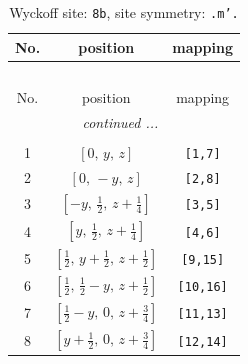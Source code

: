 \documentclass[fleqn,8pt]{jsarticle}
\begin{document}
\begin{longtable}{ccc}
\caption{Wyckoff site: {\tt 8b}, site symmetry: {\tt .m'.}}
 \\
 \hline \hline
No. & position & mapping \\ \hline \endfirsthead

\multicolumn{2}{l}{\tablename\ \thetable{}} \\
 \hline \hline
No. & position & mapping \\ \hline \endhead

 \hline \hline
\multicolumn{2}{r}{\footnotesize\it continued ...} \\ \endfoot

 \hline \hline
\multicolumn{2}{r}{} \\ \endlastfoot

1 & $\left[ 0,\, y,\, z \right]$ & {\tt [1,7]} \\ \hline
2 & $\left[ 0,\, - y,\, z \right]$ & {\tt [2,8]} \\ \hline
3 & $\left[ - y,\, \frac{1}{2},\, z + \frac{1}{4} \right]$ & {\tt [3,5]} \\ \hline
4 & $\left[ y,\, \frac{1}{2},\, z + \frac{1}{4} \right]$ & {\tt [4,6]} \\ \hline
5 & $\left[ \frac{1}{2},\, y + \frac{1}{2},\, z + \frac{1}{2} \right]$ & {\tt [9,15]} \\ \hline
6 & $\left[ \frac{1}{2},\, \frac{1}{2} - y,\, z + \frac{1}{2} \right]$ & {\tt [10,16]} \\ \hline
7 & $\left[ \frac{1}{2} - y,\, 0,\, z + \frac{3}{4} \right]$ & {\tt [11,13]} \\ \hline
8 & $\left[ y + \frac{1}{2},\, 0,\, z + \frac{3}{4} \right]$ & {\tt [12,14]} \\
\end{longtable}
\renewcommand{\arraystretch}{1.2}
\end{document}
